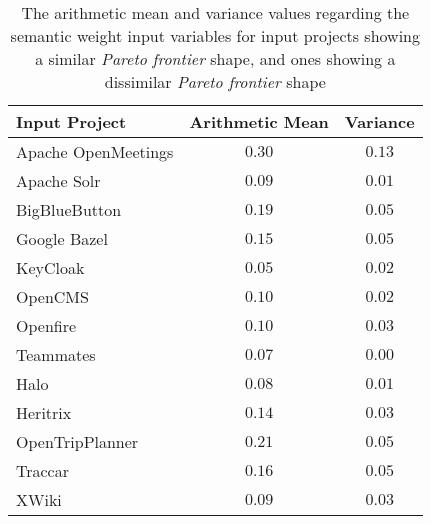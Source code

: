 \documentclass[12pt,a4paper]{report}
\begin{document}
\begin{table}[h!]
\def\arraystretch{1.55}
\begin{tabularx}{\textwidth}{|X|c|c|}
\hline
Input Project & Arithmetic Mean & Variance \\
\hline\hline

Apache OpenMeetings & $0.30$ & $0.13$ \\\hline
Apache Solr         & $0.09$ & $0.01$ \\\hline
BigBlueButton       & $0.19$ & $0.05$ \\\hline
Google Bazel        & $0.15$ & $0.05$ \\\hline
KeyCloak            & $0.05$ & $0.02$ \\\hline
OpenCMS             & $0.10$ & $0.02$ \\\hline
Openfire            & $0.10$ & $0.03$ \\\hline
Teammates           & $0.07$ & $0.00$ \\\hline
\hline\hline
Halo                & $0.08$ & $0.01$ \\\hline
Heritrix            & $0.14$ & $0.03$ \\\hline
OpenTripPlanner     & $0.21$ & $0.05$ \\\hline
Traccar             & $0.16$ & $0.05$ \\\hline
XWiki               & $0.09$ & $0.03$ \\\hline

\end{tabularx}
\caption{The arithmetic mean and variance values regarding the semantic weight input variables for input projects showing a similar \textit{Pareto frontier} shape, and ones showing a dissimilar \textit{Pareto frontier} shape}
\label{table:experiment-4.5}
\end{table}
\end{document}
